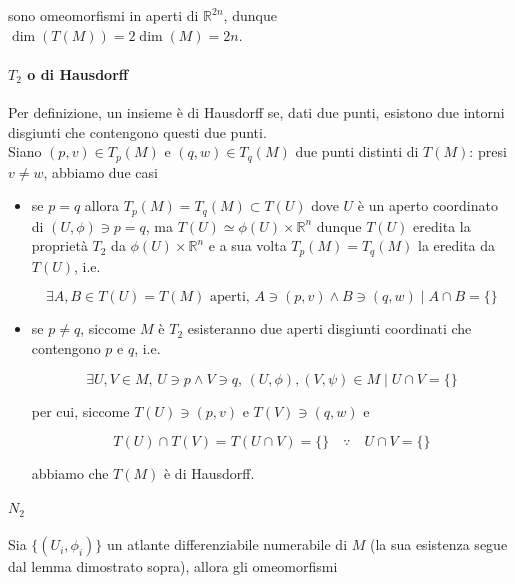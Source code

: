 sono omeomorfismi in aperti di $ \mathbb{R}^{2n} $, dunque $ \dim(T(M)) = 2 \dim(M) = 2n $.

\paragraph{$ T_{2} $ o di Hausdorff}

Per definizione, un insieme è di Hausdorff se, dati due punti, esistono due intorni disgiunti che contengono questi due punti.\\
Siano $ (p,v) \in T_{p}(M) $ e $ (q,w) \in T_{q}(M) $ due punti distinti di $ T(M) $: presi $ v \neq w $, abbiamo due casi

\begin{itemize}
	\item se $ p = q $ allora $ T_{p}(M) = T_{q}(M) \subset T(U) $ dove $ U $ è un aperto coordinato di $ (U,\phi) \ni p=q $, ma $ T(U) \simeq \phi(U) \times \mathbb{R}^{n} $ dunque $ T(U) $ eredita la proprietà $ T_{2} $ da $ \phi(U) \times \mathbb{R}^{n} $ e a sua volta $ T_{p}(M) = T_{q}(M) $ la eredita da $ T(U) $, i.e.
	
	\begin{equation}
		\exists A,B \in T(U) = T(M) \text{ aperti}, \, A \ni (p,v) \wedge B \ni (q,w) \mid A \cap B = \{\}
	\end{equation}
	
	\item se $ p \neq q $, siccome $ M $ è $ T_{2} $ esisteranno due aperti disgiunti coordinati che contengono $ p $ e $ q $, i.e.
	
	\begin{equation}
		\exists U,V \in M, \, U \ni p \wedge V \ni q, \, (U,\phi),(V,\psi) \in M \mid U \cap V = \{\}
	\end{equation}

	per cui, siccome $ T(U) \ni (p,v) $ e $ T(V) \ni (q,w) $ e
	
	\begin{equation}
		T(U) \cap T(V) = T(U \cap V) = \{\} \quad \because \quad U \cap V = \{\}
	\end{equation}

	abbiamo che $ T(M) $ è di Hausdorff.
\end{itemize}

\paragraph{$ N_{2} $}

Sia $ \{(U_{i},\phi_{i})\} $ un atlante differenziabile numerabile di $ M $ (la sua esistenza segue dal lemma dimostrato sopra), allora gli omeomorfismi


